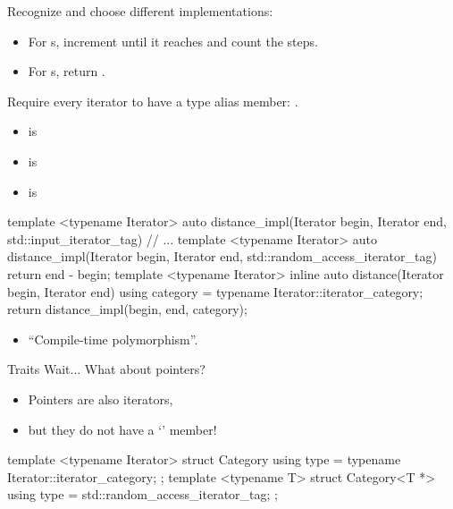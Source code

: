 \begin{frame}[fragile]{}
    Recognize and choose different implementations:
    \begin{itemize}
        \item For s, increment  until it reaches  and count the steps.
        \item For s, return .
    \end{itemize}
    \pause
    Require every iterator to have a type alias member: .
    \begin{itemize}
        \item {} is 
        \item {} is 
        \item {} is 
    \end{itemize}
\end{frame}

\begin{frame}[fragile]{}
    \begin{cpp}
template <typename Iterator>
auto distance_impl(Iterator begin, Iterator end,
                   std::input_iterator_tag) {
  // ...
}
template <typename Iterator>
auto distance_impl(Iterator begin, Iterator end,
                   std::random_access_iterator_tag) {
  return end - begin;
}
template <typename Iterator>
inline auto distance(Iterator begin, Iterator end) {
  using category = typename Iterator::iterator_category;
  return distance_impl(begin, end, category{});
}
    \end{cpp}
    \begin{itemize}
        \item ``Compile-time polymorphism''.
    \end{itemize}
\end{frame}

\begin{frame}[fragile]{Traits}
    Wait... What about pointers?
    \begin{itemize}
        \item Pointers are also iterators,
        \item but they do not have a `' member!
    \end{itemize}
    \pause
    \begin{cpp}
template <typename Iterator>
struct Category {
  using type = typename Iterator::iterator_category;
};
template <typename T>
struct Category<T *> {
  using type = std::random_access_iterator_tag;
};
    \end{cpp}
\end{frame}

